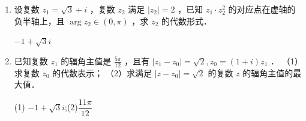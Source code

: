 \begin{enumerate}
\item 设复数 $z_1=\sqrt{3}+i$ ，复数 $z_2$ 满足 $\left|z_2\right|=2$ ，已知 $z_1 \cdot z_2^2$ 的对应点在虚轴的负半轴上，且 $\arg z_2 \in(0, \pi)$ ，求 $z_2$ 的代数形式．
\begin{jieda}
    $-1+\sqrt{3}i$
\end{jieda}

\item 已知复数 $z_1$ 的辐角主值是 $\frac{5 \pi}{12}$ ，且有 $\left|z_1-z_0\right|=\sqrt{2}, z_0=(1+i) z_1$ ．
（1）求复数 $z_0$ 的代数表示；
（2）求满足 $\left|z-z_0\right|=\sqrt{2}$ 的复数 $z$ 的辐角主值的最大值．
\begin{jieda}
    (1) $-1+\sqrt{3}i$;(2)$\dfrac{11\pi}{12}$
\end{jieda}




\end{enumerate}